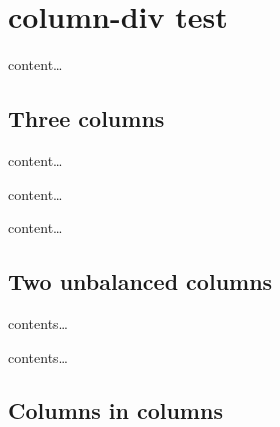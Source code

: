 \hypertarget{column-div-test}{%
\section{column-div test}\label{column-div-test}}

content\ldots{}

\hypertarget{three-columns}{%
\subsection{Three columns}\label{three-columns}}

\begin{multicols}{3}

content\ldots{}

content\ldots{}

content\ldots{}

\end{multicols}

\hypertarget{two-unbalanced-columns}{%
\subsection{Two unbalanced columns}\label{two-unbalanced-columns}}

\begin{minipage}[b]{0.4\columnwidth}

contents\ldots{}

\end{minipage}\begin{minipage}[b]{0.6\columnwidth}

contents\ldots{}

\end{minipage}

\hypertarget{columns-in-columns}{%
\subsection{Columns in columns}\label{columns-in-columns}}

